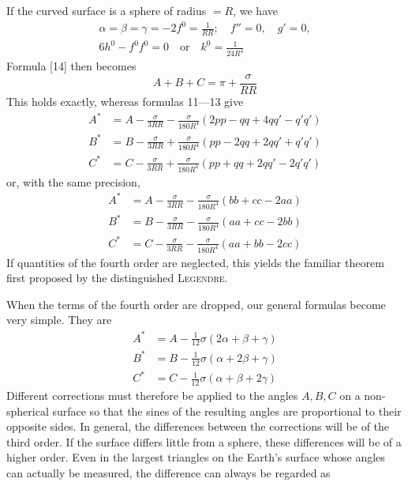 \indent If the curved surface is a sphere of radius \(=R\), we have
\[
\begin{gathered}
\alpha=\beta=\gamma=-2f^0=\frac{1}{RR};\quad f''=0,\quad g'=0,\\
6h^0-f^0f^0=0\quad\text{or}\quad k^0=\frac{1}{24R^4}
\end{gathered}
\]
Formula [14] then becomes
\[
A+B+C=\pi+\frac{\sigma}{RR}
\]
This holds exactly, whereas formulas 11—13 give
\[
\begin{aligned}
A^*&=A-\frac{\sigma}{3RR}-\frac{\sigma}{180R^4}(2pp-qq+4qq'-q'q')\\
B^*&=B-\frac{\sigma}{3RR}+\frac{\sigma}{180R^4}(pp-2qq+2qq'+q'q')\\
C^*&=C-\frac{\sigma}{3RR}+\frac{\sigma}{180R^4}(pp+qq+2qq'-2q'q')
\end{aligned}
\]
or, with the same precision,
\[
\begin{aligned}
A^*&=A-\frac{\sigma}{3RR}-\frac{\sigma}{180R^4}(bb+cc-2aa)\\
B^*&=B-\frac{\sigma}{3RR}-\frac{\sigma}{180R^4}(aa+cc-2bb)\\
C^*&=C-\frac{\sigma}{3RR}-\frac{\sigma}{180R^4}(aa+bb-2cc)
\end{aligned}
\]
If quantities of the fourth order are neglected, this yields the familiar theorem first proposed by the distinguished \textsc{Legendre}.

\indent When the terms of the fourth order are dropped, our general formulas become very simple. They are
\[
\begin{aligned}
A^*&=A-\tfrac{1}{12}\sigma(2\alpha+\beta+\gamma)\\
B^*&=B-\tfrac{1}{12}\sigma(\alpha+2\beta+\gamma)\\
C^*&=C-\tfrac{1}{12}\sigma(\alpha+\beta+2\gamma)
\end{aligned}
\]
Different corrections must therefore be applied to the angles \(A,B,C\) on a non-spherical surface so that the sines of the resulting angles are proportional to their opposite sides. In general, the differences between the corrections will be of the third order. If the surface differs little from a sphere, these differences will be of a higher order. Even in the largest triangles on the Earth’s surface whose angles can actually be measured, the difference can always be regarded as

